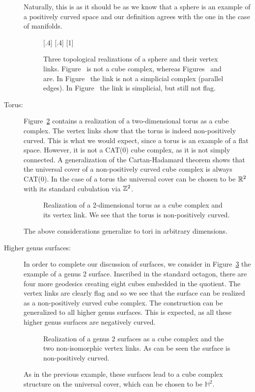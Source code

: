 \begin{bsp}
\begin{description}
    Naturally, this is as it should be as we know that a sphere is an example of a positively curved space and our definition agrees with the one in the case of manifolds.
    \begin{figure}[htbp]
      \centering
      \subcaptionbox{\label{fig:sphere-a}}[.4\linewidth]{}%
      \subcaptionbox{\label{fig:sphere-b}}[.4\linewidth]{}
      \subcaptionbox{\label{fig:sphere-c}}[1\linewidth]{}%
      \caption{Three topological realizations of a sphere and their vertex links. Figure~ is not a cube complex, whereas Figures~ and~ are. In Figure~ the link is not a simplicial complex (parallel edges). In Figure~ the link is simplicial, but still not flag.}
      \label{fig:sphere}
    \end{figure}
  \item[Torus:] Figure~\ref{fig:torus} contains a realization of a two-dimensional torus as a cube complex. The vertex links show that the torus is indeed non-positively curved. This is what we would expect, since a torus is an example of a flat space. However, it is not a CAT(0) cube complex, as it is not simply connected. A generalization of the Cartan-Hadamard theorem shows that the universal cover of a non-positively curved cube complex is always CAT(0). In the case of a torus the universal cover can be chosen to be \(\mathbb{R}^2\) with its standard cubulation via \(\mathbb{Z}^2\).
    \begin{figure}[htbp]
      \centering
      
      \caption{Realization of a 2-dimensional torus as a cube complex and its vertex link. We see that the torus is non-positively curved.}
      \label{fig:torus}
    \end{figure}

    The above considerations generalize to tori in arbitrary dimensions.
  \item[Higher genus surfaces:] In order to complete our discussion of surfaces, we consider in Figure~\ref{fig:genus-2} the example of a genus 2 surface. Inscribed in the standard octagon, there are four more geodesics creating eight cubes embedded in the quotient. The vertex links are clearly flag and so we see that the surface can be realized as a non-positively curved cube complex. The construction can be generalized to all higher genus surfaces. This is expected, as all these higher genus surfaces are negatively curved.
    \begin{figure}[htbp]
      \centering
      
      \caption{Realization of a genus 2 surfaces as a cube complex and the two non-isomorphic vertex links. As can be seen the surface is non-positively curved.}
      \label{fig:genus-2}
    \end{figure}

    As in the previous example, these surfaces lead to a cube complex structure on the universal cover, which can be chosen to be \(\mathbb{H}^2\).
  \end{description}
\end{bsp}


